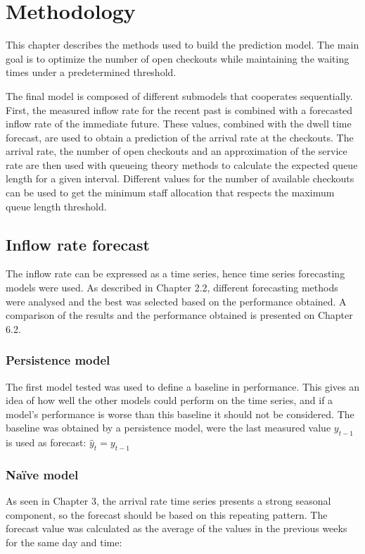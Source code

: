 \chapter{Methodology}
\label{cha:methodology}

This chapter describes the methods used to build the prediction model. The main goal is to optimize the number of open checkouts while maintaining the waiting times under a predetermined threshold.

The final model is composed of different submodels that cooperates sequentially. First, the measured inflow rate for the recent past is combined with a forecasted inflow rate of the immediate future. These values, combined with the dwell time forecast, are used to obtain a prediction of the arrival rate at the checkouts. The arrival rate, the number of open checkouts and an approximation of the service rate are then used with queueing theory methods to calculate the expected queue length for a given interval. Different values for the number of available checkouts can be used to get the minimum staff allocation that respects the maximum queue length threshold.

\section{Inflow rate forecast}
\label{sec:inflow_rate_forecast}

The inflow rate can be expressed as a time series, hence time series forecasting models were used. As described in Chapter 2.2, different forecasting methods were analysed and the best was selected based on the performance obtained. A comparison of the results and the performance obtained is presented on Chapter 6.2.

\subsection{Persistence model}
\label{subsec:persistence_model}
The first model tested was used to define a baseline in performance. This gives an idea of how well the other models could perform on the time series, and if a model’s performance is worse than this baseline it should not be considered. The baseline was obtained by a persistence model, were the last measured value $ y_{t-1} $ is used as forecast:
$ \hat{y}_t = y_{t-1} $

\subsection{Naïve model}
\label{subsec:naive_model}
As seen in Chapter 3, the arrival rate time series presents a strong seasonal component, so the forecast should be based on this repeating pattern. The forecast value was calculated as the average of the values in the previous weeks for the same day and time:

